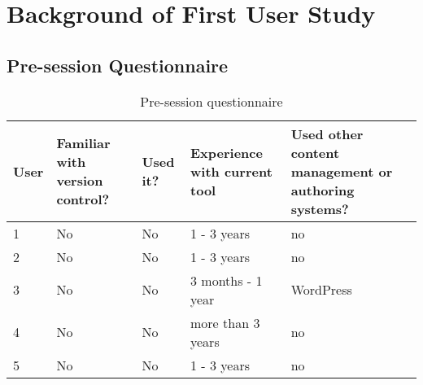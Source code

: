 \chapter{Background of First User Study}
\label{sec:first-iteration-scenarios}


\section{Pre-session Questionnaire} \label{append:presession-quest-1}

\begin{table}[h!]
\begin{tabular}{|l|p{3cm}|p{1.5cm}|p{2cm}|p{3cm}|}
\hline
{\bf User} & {\bf Familiar with version control?} & {\bf Used it?} & {\bf Experience with current tool} & {\bf Used other content management or authoring systems?} \\ \hline
1 & No & No & 1 - 3 years & no \\ \hline
2 & No & No & 1 - 3 years & no \\ \hline
3 & No & No & 3 months - 1 year & WordPress \\ \hline
4 & No & No & more than 3 years & no \\ \hline
5 & No & No & 1 - 3 years & no \\ \hline
\end{tabular}
\centering
\caption{Pre-session questionnaire}
\label{table:pre-sess-quest}
\end{table}
